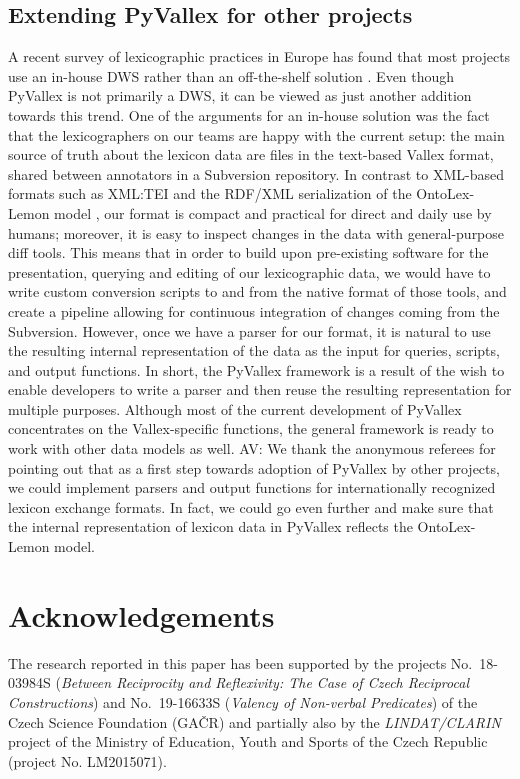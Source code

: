 \documentclass[10pt, a4paper]{article}
\newcommand{\av}[1]{{\color{ansa} AV: #1}}
\begin{document}
\subsection{Extending PyVallex for other projects}
A recent survey of lexicographic practices in Europe  has found that most projects use an in-house DWS rather than an off-the-shelf solution
\cite{KallasEtAl19lexicographic}.
Even though PyVallex is not primarily a DWS, it can be viewed as just another addition towards this trend.
One of the arguments for an in-house solution was the fact that the lexicographers on our teams are happy with the current setup:
the main source of truth about the lexicon data are files in the text-based Vallex format,
shared between annotators in a Subversion repository.
In contrast to XML-based formats such as XML:TEI \cite{XMLTEI2020}
and the RDF/XML serialization of the OntoLex-Lemon model \cite{BosqueGilGracia19OntoLex},
our format is compact and practical for direct and daily use by humans;
moreover, it is easy to inspect changes in the data with general-purpose diff tools.
This means that in order to build upon pre-existing software for the presentation, querying and editing of our lexicographic data,
we would have to write custom conversion scripts to and from the native format of those tools,
and create a pipeline allowing for continuous integration of changes coming from the Subversion.
However, once we have a parser for our format,
it is natural to use the resulting internal representation of the data as the input for queries, scripts, and output functions.
In short, the PyVallex framework is a result of the wish to enable developers to write a parser and then reuse the resulting representation for multiple purposes.
Although most of the current development of PyVallex concentrates on the Vallex-specific functions,
the general framework is ready to work with other data models as well.
\av{We thank the anonymous referees for pointing out that as a first step towards adoption of PyVallex by other projects,
we could implement parsers and output functions for internationally recognized lexicon exchange formats.
In fact, we could go even further and make sure that the internal representation of lexicon data in PyVallex reflects the OntoLex-Lemon model.}


\section{Acknowledgements}
The research reported in this paper has been supported by the projects No.\ 18-03984S (\textit{Between Reciprocity and Reflexivity: The Case of Czech Reciprocal Constructions}) and No.\ 19-16633S (\textit{Valency of Non-verbal Predicates}) of the  Czech Science Foundation (GA{\v{C}R}) and partially also by the \textit{LINDAT/CLARIN} project of the Ministry of Education, Youth and Sports of the Czech Republic (project No. LM2015071).
\end{document}
